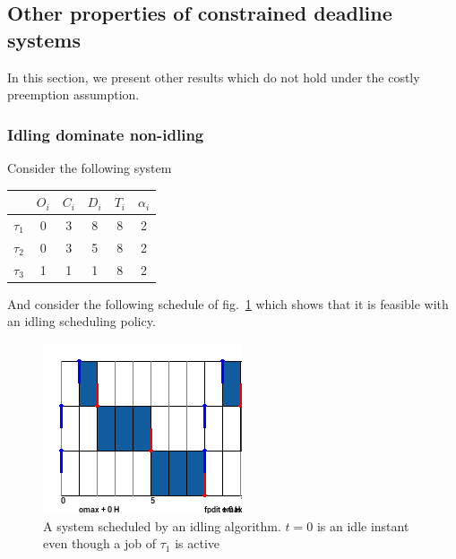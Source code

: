 \documentclass[a4paper,10pt]{article}
\begin{document}
    \subsection{Other properties of constrained deadline systems}

    In this section, we present other results which do not hold under the costly preemption assumption.

        \subsubsection{Idling dominate non-idling}

        Consider the following system

        \begin{center}
            \begin{tabular}{|r|c|c|c|c|c|}
                \hline
                            & $O_i$ & $C_i$ & $D_i$ & $T_i$ & $\alpha_i$ \\ \hline
                $\tau_1$    & 0     & 3     & 8    & 8     & 2     \\ \hline
                $\tau_2$    & 0     & 3     & 5    & 8     & 2     \\ \hline
                $\tau_3$    & 1     & 1     & 1    & 8     & 2     \\ \hline
            \end{tabular}
        \end{center}

        And consider the following schedule of fig.~\ref{fig:mustidle_pallf} which shows that it is feasible with an idling scheduling policy.

        \begin{figure}[H]
        \begin{center}
            \includegraphics[scale=0.7]{figs/mustIdle_PALLF.png}
            \caption{A system scheduled by an idling algorithm. $t=0$ is an idle instant even though a job of $\tau_1$ is active}
            \label{fig:mustidle_pallf}
        \end{center}
        \end{figure}
\end{document}
